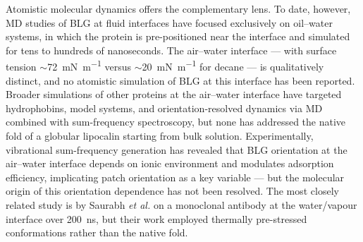 \documentclass[11pt,a4paper]{article}
\begin{document}
Atomistic molecular dynamics offers the complementary lens. To date, however,
MD studies of BLG at fluid interfaces have focused exclusively on
oil--water systems, in which the protein is pre-positioned near the interface
and simulated for tens to hundreds of
nanoseconds\citep{Zare2015,Zare2016}. The air--water interface --- with
surface tension $\sim$\SI{72}{\milli\newton\per\metre} versus
$\sim$\SI{20}{\milli\newton\per\metre} for decane --- is qualitatively
distinct, and no atomistic simulation of BLG at this interface has been
reported. Broader simulations of other proteins at the air--water interface
have targeted hydrophobins\citep{Magarkar2014}, model systems\citep{Euston2010,Cieplak2014},
and orientation-resolved dynamics via MD combined with sum-frequency
spectroscopy\citep{Alamdari2020}, but none has addressed the native fold of
a globular lipocalin starting from bulk solution. Experimentally,
vibrational sum-frequency generation has revealed that BLG orientation
at the air--water interface depends on ionic environment and modulates
adsorption efficiency\citep{Beierlein2015}, implicating patch orientation
as a key variable --- but the molecular origin of this orientation dependence
has not been resolved. The most closely related
study is by Saurabh \textit{et al.} on a monoclonal antibody at the
water/vapour interface over \SI{200}{\nano\second}, but their work employed
thermally pre-stressed conformations rather than the native fold\citep{Saurabh2024}.
\end{document}
